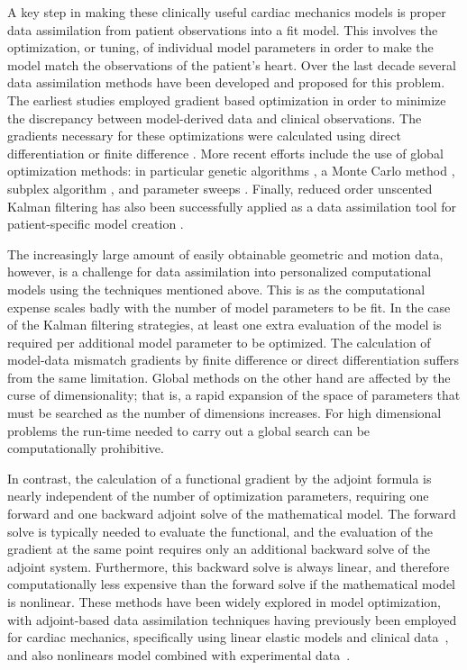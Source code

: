 A key step in making these clinically useful cardiac mechanics models is proper data assimilation from patient observations into a fit model. This involves the optimization, or tuning, of individual model parameters in order to make the model match the observations of the patient's heart.  Over the last decade several data assimilation methods have been developed and proposed for this problem. The earliest studies employed gradient based optimization in order to minimize the discrepancy between model-derived data and clinical observations.  The gradients necessary for these optimizations were calculated using direct differentiation \cite{sermesant2006cardiac}
or finite difference \cite{augenstein2005method, gao2015parameter, Wang2009}.
More recent efforts include the use of global optimization methods:
in particular genetic algorithms \cite{mojsejenko2014estimating,
sun2009computationally}, a Monte Carlo method \cite{neumann2014robust},
subplex algorithm \cite{wong2015velocity}, and parameter sweeps \cite{asner2015estimation, hadjicharalambous2015analysis}.
Finally, reduced order unscented Kalman filtering has also been successfully applied as
a data assimilation tool for patient-specific model creation \cite{chabiniok2012estimation,
xi2011myocardial, Marchesseau2013}.

The increasingly large amount of easily obtainable geometric and motion data, 
however, is a challenge for data assimilation into personalized computational models 
using the techniques mentioned above.  This is as the computational 
expense scales badly with the number of model parameters to be fit. In the 
case of the Kalman filtering strategies, at least one extra evaluation 
of the model is required per additional model parameter to be optimized.
The calculation of model-data mismatch gradients by finite difference 
or direct differentiation suffers from the same limitation. Global methods 
on the other hand are affected by the curse of dimensionality; that is, 
a rapid expansion of the space of parameters that must be searched as the number 
of dimensions increases. For high dimensional problems 
the run-time needed to carry out a global search can be computationally prohibitive.

In contrast, the calculation of a functional gradient by the adjoint formula is 
nearly independent of the number of optimization parameters, requiring one forward and one backward 
adjoint solve of the mathematical model. The forward solve is typically needed to evaluate the functional, 
and the evaluation of the gradient at the same point requires only an additional backward solve of the adjoint system.
Furthermore, this backward solve is always linear, 
and therefore computationally less expensive than the forward solve 
if the mathematical model is nonlinear. These methods have been widely explored in model optimization, 
with adjoint-based data assimilation techniques having previously been
employed for cardiac mechanics, specifically using linear elastic models and
clinical data~\cite{Delingette2012, sundar2009biomechanically}, and
also nonlinears model combined with experimental
data~\cite{balaban2016adjoint}.

